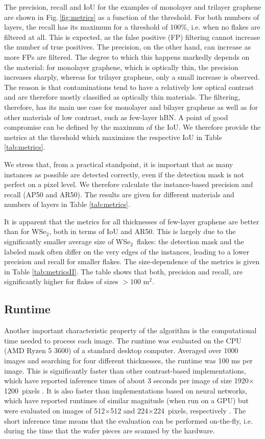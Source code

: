 \documentclass[reprint, prl, superscriptaddress, floatfix]{revtex4-2}
\newcommand{\fig}[1]{Fig.\,\ref{#1}}
\newcommand{\WSe}{WSe$_2$}
\begin{document}
The precision, recall and IoU for the examples of monolayer and trilayer graphene are shown in \fig{fig:metrics} as a function of the threshold.
For both numbers of layers, the recall has its maximum for a threshold of 100\%, i.e. when no flakes are filtered at all.
This is expected, as the false positive (FP) filtering cannot increase the number of true positives. 
The precision, on the other hand, can increase as more FPs are filtered. 
The degree to which this happens markedly depends on the material: for monolayer graphene, which is optically thin, the precision increases sharply, whereas for trilayer graphene, only a small increase is observed. 
The reason is that contaminations tend to have a relatively low optical contrast and are therefore mostly classified as optically thin materials.
The filtering, therefore, has its main use case for monolayer and bilayer graphene as well as for other materials of low contrast, such as few-layer hBN. 
A point of good compromise can be defined by the maximum of the IoU.
We therefore provide the metrics at the threshold which maximizes the respective IoU in Table \ref{tab:metrics}. 

We stress that, from a practical standpoint, it is important that as many instances as possible are detected correctly, even if the detection mask is not perfect on a pixel level. 
We therefore calculate the instance-based precision and recall (AP50 and AR50).
The results are given for different materials and numbers of layers in Table \ref{tab:metrics}.


It is apparent that the metrics for all thicknesses of few-layer graphene are better than for \WSe, both in terms of IoU and AR50.
This is largely due to the significantly smaller average size of \WSe\ flakes: the detection mask and the labeled mask often differ on the very edges of the instances, leading to a lower precision and recall for smaller flakes.  
The size-dependence of the metrics is given in Table \ref{tab:metricsII}. 
The table shows that both, precision and recall, are significantly higher for flakes of sizes $>100$ \textmu m$^2$. 




\subsection{Runtime}
Another important characteristic property of the algorithm is the computational time needed to process each image. 
The runtime was evaluated on the CPU (AMD Ryzen 5 3600) of a standard desktop computer. 
Averaged over 1000 images and searching for four different thicknesses, the runtime was 100 ms per image. 
This is significantly faster than other contrast-based implementations, which have reported inference times of about 3 seconds per image of size 1920$\times$1200~pixels \cite{Yang2020Sep}.
It is also faster than implementations based on neural networks, which have reported runtimes of similar magnitude (when run on a GPU) but were evaluated on images of 512$\times$512 and 224$\times$224~pixels, respectively \cite{Yang2022Aug,Han2020Jul}.
The short inference time means that the evaluation can be performed on-the-fly, i.e. during the time that the wafer pieces are scanned by the hardware.
\end{document}
